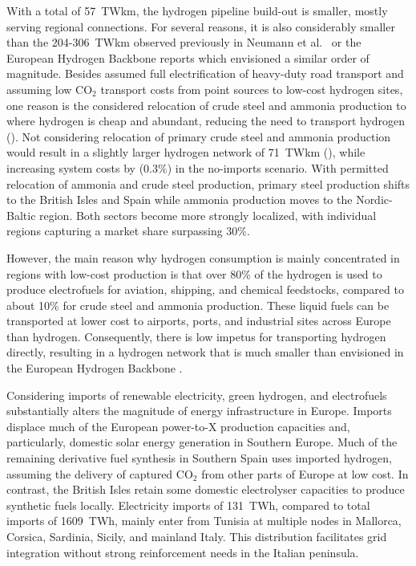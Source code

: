 
With a total of 57~TWkm, the hydrogen pipeline build-out is smaller, mostly
serving regional connections. For several reasons, it is also considerably
smaller than the 204-306~TWkm observed previously in Neumann et
al.~\cite{neumannPotentialRoleHydrogen2023} or the European Hydrogen Backbone
reports\cite{gasforclimateEuropeanHydrogen2022} which envisioned a similar order
of magnitude. Besides assumed full electrification of heavy-duty road
transport\cite{} and assuming low CO$_2$ transport costs from point sources to
low-cost hydrogen sites,\cite{hofmannH2CO2Network2024} one reason is the
considered relocation of crude steel and ammonia production to where hydrogen is
cheap and abundant, reducing the need to transport hydrogen
(). Not considering relocation of primary crude steel
and ammonia production would result in a slightly larger hydrogen network of
71~TWkm (), while increasing system costs by
 (0.3\%) in the no-imports scenario. With permitted relocation of
ammonia and crude steel production, primary steel production shifts to the
British Isles and Spain while ammonia production moves to the Nordic-Baltic
region. Both sectors become more strongly localized, with individual regions
capturing a market share surpassing 30\%.

However, the main reason why hydrogen consumption is mainly concentrated in
regions with low-cost production is that over 80\% of the hydrogen is used to
produce electrofuels for aviation, shipping, and chemical feedstocks, compared
to about 10\% for crude steel and ammonia production. These liquid fuels can be
transported at lower cost to airports, ports, and industrial sites across Europe
than hydrogen. Consequently, there is low impetus for transporting hydrogen
directly, resulting in a hydrogen network that is much smaller than envisioned
in the European Hydrogen Backbone \cite{gasforclimateEuropeanHydrogen2022}.


Considering imports of renewable electricity, green hydrogen, and electrofuels
substantially alters the magnitude of energy infrastructure in Europe. Imports
displace much of the European power-to-X production capacities and,
particularly, domestic solar energy generation in Southern Europe. Much of the
remaining derivative fuel synthesis in Southern Spain uses imported hydrogen,
assuming the delivery of captured CO$_2$ from other parts of Europe at low
cost.\cite{hofmannH2CO2Network2024} In contrast, the British Isles retain some
domestic electrolyser capacities to produce synthetic fuels locally. Electricity
imports of 131~TWh, compared to total imports of 1609~TWh, mainly enter from
Tunisia at multiple nodes in Mallorca, Corsica, Sardinia, Sicily, and mainland
Italy. This distribution facilitates grid integration without strong
reinforcement needs in the Italian peninsula.

